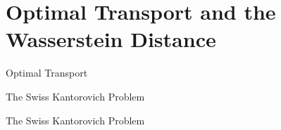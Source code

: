 \documentclass[10pt]{beamer}
\begin{document}
\section{Optimal Transport and the Wasserstein Distance}

\begin{frame}{Optimal Transport}
	
\end{frame}

\begin{frame}{The Swiss Kantorovich Problem}
	
\end{frame}

\begin{frame}{The Swiss Kantorovich Problem}
	
\end{frame}

\end{document}
